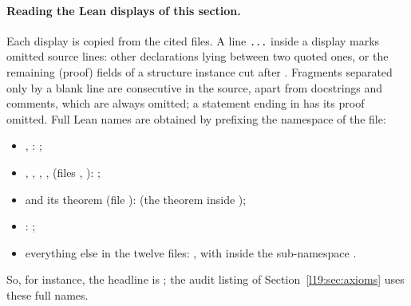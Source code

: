 \paragraph{Reading the Lean displays of this section.} Each display is copied from the cited files. A line
\texttt{...} inside a display marks omitted source lines: other declarations lying between two quoted ones, or the
remaining (proof) fields of a structure instance cut after . Fragments separated only by a blank line are
consecutive in the source, apart from docstrings and comments, which are always omitted; a statement ending in
 has its proof omitted. Full Lean names are obtained by prefixing the namespace of the file:
\begingroup\raggedright
\begin{itemize}
\item {}, : ;
\item {}, , , ,
   (files ,
  ): ;
\item {} and its theorem  (file
  ):  (the theorem inside
  );
\item {}: ;
\item everything else in the twelve files: , with  inside the
  sub-namespace .
\end{itemize}
So, for instance, the headline is \allowbreak{}\allowbreak{}\allowbreak{}\allowbreak{};
the audit listing of Section~\ref{l19:sec:axioms} uses these full names.\par
\endgroup

